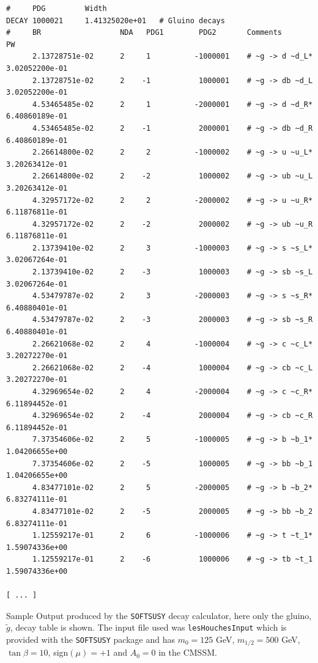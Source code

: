 \documentclass[final,3p,times]{elsarticle}
\begin{document}
\begin{center}
\begin{table} %
\centering
{\small
\begin{verbatim}
#     PDG         Width             
DECAY 1000021     1.41325020e+01   # Gluino decays
#     BR                  NDA   PDG1        PDG2       Comments                          PW                
      2.13728751e-02      2     1          -1000001    # ~g -> d ~d_L*              3.02052200e-01    
      2.13728751e-02      2    -1           1000001    # ~g -> db ~d_L              3.02052200e-01    
      4.53465485e-02      2     1          -2000001    # ~g -> d ~d_R*              6.40860189e-01    
      4.53465485e-02      2    -1           2000001    # ~g -> db ~d_R              6.40860189e-01    
      2.26614800e-02      2     2          -1000002    # ~g -> u ~u_L*              3.20263412e-01    
      2.26614800e-02      2    -2           1000002    # ~g -> ub ~u_L              3.20263412e-01    
      4.32957172e-02      2     2          -2000002    # ~g -> u ~u_R*              6.11876811e-01    
      4.32957172e-02      2    -2           2000002    # ~g -> ub ~u_R              6.11876811e-01    
      2.13739410e-02      2     3          -1000003    # ~g -> s ~s_L*              3.02067264e-01    
      2.13739410e-02      2    -3           1000003    # ~g -> sb ~s_L              3.02067264e-01    
      4.53479787e-02      2     3          -2000003    # ~g -> s ~s_R*              6.40880401e-01    
      4.53479787e-02      2    -3           2000003    # ~g -> sb ~s_R              6.40880401e-01    
      2.26621068e-02      2     4          -1000004    # ~g -> c ~c_L*              3.20272270e-01    
      2.26621068e-02      2    -4           1000004    # ~g -> cb ~c_L              3.20272270e-01    
      4.32969654e-02      2     4          -2000004    # ~g -> c ~c_R*              6.11894452e-01    
      4.32969654e-02      2    -4           2000004    # ~g -> cb ~c_R              6.11894452e-01    
      7.37354606e-02      2     5          -1000005    # ~g -> b ~b_1*              1.04206655e+00    
      7.37354606e-02      2    -5           1000005    # ~g -> bb ~b_1              1.04206655e+00    
      4.83477101e-02      2     5          -2000005    # ~g -> b ~b_2*              6.83274111e-01    
      4.83477101e-02      2    -5           2000005    # ~g -> bb ~b_2              6.83274111e-01    
      1.12559217e-01      2     6          -1000006    # ~g -> t ~t_1*              1.59074336e+00    
      1.12559217e-01      2    -6           1000006    # ~g -> tb ~t_1              1.59074336e+00    

[ ... ]
\end{verbatim}   
\caption{Sample Output produced by the {\tt SOFTSUSY} decay calculator, here only the 
gluino, $\tilde{g}$, decay table is shown. The input file used was {\tt lesHouchesInput}
which is provided with the {\tt SOFTSUSY} package and has $m_0 = 125$ GeV, $m_{1/2} = 500$ GeV,
$\tan\beta = 10$, sign$(\mu) = +1$ and $A_0 = 0$ in the CMSSM.} \label{sampleoutput}
}
\end{table}
\end{center}
\end{document}
